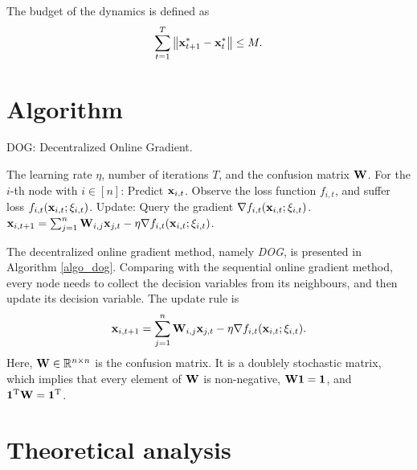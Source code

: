 \documentclass{article}
\begin{document}
The budget of the dynamics is defined as
\begin{align}
\label{equa_define_M}
\sum_{t=1}^T \left\lVert{\bf x}_{t+1}^\ast - {\bf x}_t^\ast\right\rVert \le M.
\end{align}







\section{Algorithm}


\newcommand\StateX{\Statex\hspace{\algorithmicindent}}
\begin{algorithm}[!]
   \caption{DOG: Decentralized Online Gradient.}
   \label{algo_dog}
   \begin{algorithmic}[1]
   \Require The learning rate $\eta$, number of iterations $T$, and the confusion matrix ${\bf W}$.
           \StateX For the $i$-th node with $i\in[n]$:
            \State \indent Predict ${\bf x}_{i,t}$.
            \State \indent Observe the loss function $f_{i,t}$,
            \StateX \indent and suffer loss $f_{i,t}({\bf x}_{i,t};\xi_{i,t})$.
            \StateX Update:
            \State \indent Query the gradient $\nabla f_{i,t}({\bf x}_{i,t};\xi_{i,t})$.  
            \State \indent ${\bf x}_{i,t+1} = \sum_{j=1}^n {\bf W}_{i,j}{\bf x}_{j,t} - \eta \nabla f_{i,t}({\bf x}_{i,t};\xi_{i,t})$. 
       \EndFor
   \end{algorithmic}
\end{algorithm}


The decentralized online gradient method, namely \textit{DOG}, is presented in Algorithm \ref{algo_dog}. Comparing with the sequential online gradient method, every node needs to collect the decision variables from its neighbours, and then update its decision variable. The update rule is 
\begin{align}
\nonumber
{\bf x}_{i,t+1} = \sum_{j=1}^n {\bf W}_{i,j}{\bf x}_{j,t} - \eta \nabla f_{i,t}({\bf x}_{i,t};\xi_{i,t}).
\end{align} Here, ${\bf W} \in\mathbb{R}^{n \times n}$ is the confusion matrix. It is a doublely stochastic matrix, which implies that every element of ${\bf W}$ is non-negative, ${\bf W} {\bf 1} = {\bf 1}$, and ${\bf 1}^{\rm T}{\bf W}  = {\bf 1}^{\rm T}$. 
   





\section{Theoretical analysis}
\end{document}
